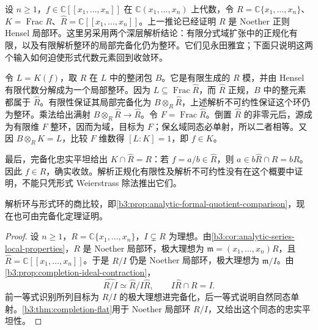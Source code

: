 \begin{proofsketch}
	设 \(n\ge1\)，\(f\in\mathbb C[\![x_1,\ldots,x_n]\!]\) 在 \(\mathbb C(x_1,\ldots,x_n)\) 上代数，令 \(R=\mathbb C\{x_1,\ldots,x_n\}\)、\(K=\operatorname{Frac}R\)、\(\widehat R=\mathbb C[\![x_1,\ldots,x_n]\!]\)。上一推论已经证明 \(R\) 是 Noether 正则 Hensel 局部环。这里另采用两个深层解析结论：有限分式域扩张中的正规化有限，以及有限解析整环的局部完备化仍为整环。它们见永田雅宜\cite[(45.6), p. 194; (45.1) and the definition of Weierstrass rings, p. 190]{Nagata1975LocalRings}；下面只说明这两个输入如何迫使形式代数元素回到收敛环。

	令 \(L=K(f)\)，取 \(R\) 在 \(L\) 中的整闭包 \(B\)。它是有限生成的 \(R\) 模，并由 Hensel 有限代数分解\cite[(43.15), p. 185]{Nagata1975LocalRings}成为一个局部整环。因为 \(L\subseteq\operatorname{Frac}\widehat R\)，而 \(\widehat R\) 正规，\(B\) 中的整元素都属于 \(\widehat R\)。有限性保证其局部完备化为 \(B\otimes_R\widehat R\)，上述解析不可约性保证这个环仍为整环。乘法给出满射 \(B\otimes_R\widehat R\longrightarrow\widehat R\)。令 \(F=\operatorname{Frac}\widehat R\)。倒置 \(\widehat R\) 的非零元后，源成为有限维 \(F\) 整环，因而为域，目标为 \(F\)；保幺域同态必单射，所以二者相等。又因 \(B\otimes_RK=L\)，比较 \(F\) 维数得 \([L:K]=1\)，即 \(f\in K\)。

	最后，完备化忠实平坦给出 \(K\cap\widehat R=R\)：若 \(f=a/b\in\widehat R\)，则 \(a\in b\widehat R\cap R=bR\)。因此 \(f\in R\)，确实收敛。解析正规化有限性及解析不可约性没有在这个概要中证明，不能只凭形式 Weierstrass 除法推出它们。
\end{proofsketch}

解析环与形式环的商比较，即\cref{b3:prop:analytic-formal-quotient-comparison}，现在也可由完备化定理证明。

\begin{proof}
	设 \(n\ge1\)，\(R=\mathbb C\{x_1,\ldots,x_n\}\)，\(I\subsetneq R\) 为理想。由\cref{b3:cor:analytic-series-local-properties}，\(R\) 是 Noether 局部环，极大理想为 \(\mathfrak m=(x_1,\ldots,x_n)R\)，且 \(\widehat R=\mathbb C[\![x_1,\ldots,x_n]\!]\)。于是 \(R/I\) 仍是 Noether 局部环，极大理想为 \(\mathfrak m/I\)。由\cref{b3:prop:completion-ideal-contraction}，
	\[
		\widehat{R/I}\simeq\widehat R/I\widehat R, \qquad I\widehat R\cap R=I.
	\]
	前一等式识别所列目标为 \(R/I\) 的极大理想进完备化，后一等式说明自然同态单射。\cref{b3:thm:completion-flat}用于 Noether 局部环 \(R/I\)，又给出这个同态的忠实平坦性。
\end{proof}

